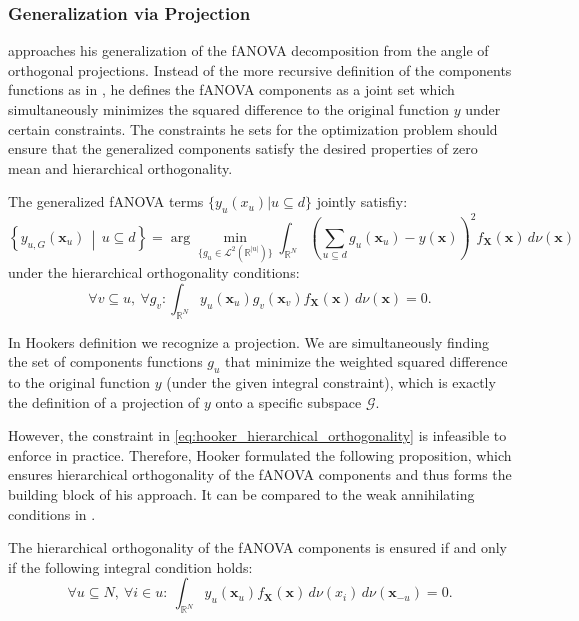 \subsubsection{Generalization via Projection}
\cite{hooker2007} approaches his generalization of the fANOVA decomposition from the angle of orthogonal projections. Instead of the more recursive definition of the components functions as in \cite{rahman2014}, he defines the fANOVA components as a joint set which simultaneously minimizes the squared difference to the original function $y$ under certain constraints.
The constraints he sets for the optimization problem should ensure that the generalized components satisfy the desired properties of zero mean and hierarchical orthogonality.

The generalized fANOVA terms $\{y_u(x_u) | u \subseteq d \}$ jointly satisfiy:
\begin{equation}
\left\{ y_{u, G}(\boldsymbol{x}_u) \,\middle|\, u \subseteq d \right\}
= \arg\min_{\{g_u \in \mathcal{L}^2(\mathbb{R}^{|u|})\}} 
\int_{\mathbb{R}^N} \left( \sum_{u \subseteq d} g_u(\boldsymbol{x}_u) - y(\boldsymbol{x}) \right)^2 f_{\boldsymbol{X}}(\boldsymbol{x}) \, d \nu (\boldsymbol{x})
\label{prop:generalized_fanova_components_hooker}
\end{equation}
under the hierarchical orthogonality conditions:
\begin{equation}
    \forall v \subseteq u,\ \forall g_v : \int_{\mathbb{R}^N} y_u(\boldsymbol{x}_u) g_v(\boldsymbol{x}_v) f_{\boldsymbol{X}}(\boldsymbol{x}) \, d \nu (\boldsymbol{x}) = 0.
\label{eq:hooker_hierarchical_orthogonality}
\end{equation}

In Hookers definition we recognize a projection. We are simultaneously finding the set of components functions $g_u$ that minimize the weighted squared difference to the original function $y$ (under the given integral constraint), which is exactly the definition of a projection of $y$ onto a specific subspace $\mathcal{G}$.\par

However, the constraint in \autoref{eq:hooker_hierarchical_orthogonality} is infeasible to enforce in practice. 
Therefore, Hooker formulated the following proposition, which ensures hierarchical orthogonality of the fANOVA components and thus forms the building block of his approach. It can be compared to the weak annihilating conditions in \cite{rahman2014}.
\begin{proposition}
    The hierarchical orthogonality of the fANOVA components is ensured if and only if the following integral condition holds:
    \begin{equation}
\forall u \subseteq N,\ \forall i \in u:\ \int_{\mathbb{R}^N} y_u(\boldsymbol{x}_u) f_{\boldsymbol{X}}(\boldsymbol{x})\, d \nu (x_i)\, d \nu (\boldsymbol{x}_{-u}) = 0.
\end{equation}
\label{prop:hooker_hierarchical_orthogonality}
\end{proposition}

